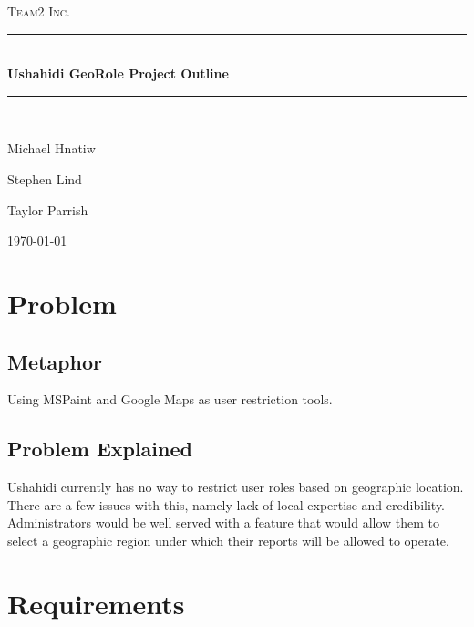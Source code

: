 \documentclass{article}
\newcommand{\HRule}{\rule{\linewidth}{0.5mm}}
\begin{document}
\begin{titlepage}
\begin{center}
\textsc{\LARGE Team2 Inc.}\\[1.5cm]

\HRule \\[1.4cm]
{ \huge \bfseries Ushahidi GeoRole Project Outline}\\[0.4cm]

\HRule \\[1.5cm]

\begin{minipage}{0.4\textwidth}
\begin{flushleft}
Michael Hnatiw
\end{flushleft}
\end{minipage}
\begin{minipage}{0.4\textwidth}
\begin{center}
Stephen Lind
\end{center}
\end{minipage}
\begin{minipage}{0.4\textwidth}
\begin{flushright}
Taylor Parrish
\end{flushright}
\end{minipage}

\vfill
{\large \today}
\end{center}
\end{titlepage}

\section{Problem}
\subsection{Metaphor}
Using MSPaint and Google Maps as user restriction tools.
\subsection{Problem Explained}
Ushahidi currently has no way to restrict user roles based on geographic location. There are a few issues with this, namely lack of local expertise and credibility. Administrators would be well served with a feature that would allow them to select a geographic region under which their reports will be allowed to operate.

\section{Requirements}
\end{document}
